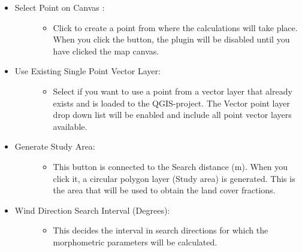 \documentclass[letterpaper,10pt,english]{sphinxmanual}
\begin{document}
\begin{itemize}
\item {} \begin{description}
\item[{Select Point on Canvas  :}] \leavevmode\begin{itemize}
\item {} 
Click to create a point from where the calculations will take place. When you click the button, the plugin will be disabled until you have clicked the map canvas.

\end{itemize}

\end{description}

\item {} \begin{description}
\item[{Use Existing Single Point Vector Layer:}] \leavevmode\begin{itemize}
\item {} 
Select if you want to use a point from a vector layer that already exists and is loaded to the QGIS-project. The Vector point layer drop down list will be enabled and include all point vector layers available.

\end{itemize}

\end{description}

\item {} \begin{description}
\item[{Generate Study Area:}] \leavevmode\begin{itemize}
\item {} 
This button is connected to the Search distance (m). When you click it, a circular polygon layer (Study area) is generated. This is the area that will be used to obtain the land cover fractions.

\end{itemize}

\end{description}

\item {} \begin{description}
\item[{Wind Direction Search Interval (Degrees):}] \leavevmode\begin{itemize}
\item {} 
This decides the interval in search directions for which the morphometric parameters will be calculated.


\end{itemize}
\end{description}
\end{itemize}
\end{document}
